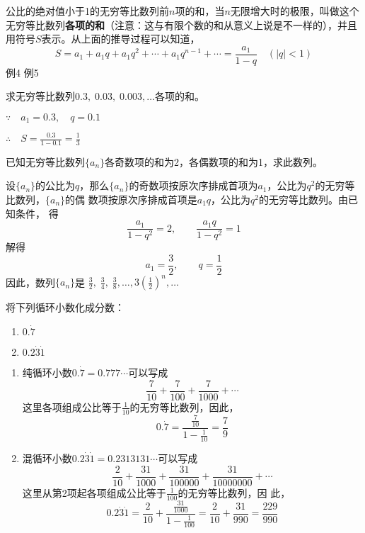 公比的绝对值小于1的无穷等比数列前$n$项的和，当$n$无限增大时的极限，叫做这个无穷等比数列\textbf{各项的和}（注意：这与有限个数的和从意义上说是不一样的），并且用符号$S$表示。从上面的推导过程可以知道，
\[S=a_1+a_1q+a_1q^2+\cdots +a_1q^{n-1}+\cdots=\frac{a_1}{1-q}\quad (|q|<1)\]
例4 
例5 



\begin{example}
    求无穷等比数列$0.3,\; 0.03,\; 0.003,\ldots$各项的和。
\end{example}

\begin{solution}
$\because\quad a_1=0.3,\quad q=0.1$

$\therefore\quad S=\frac{0.3}{1-0.1}=\frac{1}{3}$        
\end{solution}

\begin{example}
    已知无穷等比数列$\{a_n\}$各奇数项的和为2，各偶数项的和为1，求此数列。
\end{example}

\begin{solution}
设$\{a_n\}$的公比为$q$，那么$\{a_n\}$的奇数项按原次序排成首项为$a_1$，公比为$q^2$的无穷等比数列，$\{a_n\}$的偶 数项按原次序排成首项是$a_1q$，公比为$q^2$的无穷等比数列。由已知条件，
得
\[\frac{a_1}{1-q^2}=2,\qquad \frac{a_1 q}{1-q^2}=1\]
解得    
\[a_1=\frac{3}{2},\qquad q=\frac{1}{2}\]
因此，数列$\{a_n\}$是
$\frac{3}{2},\; \frac{3}{4},\; \frac{3}{8},\ldots, 3\left(\frac{1}{2}\right)^n,\ldots$
\end{solution}



\begin{example}
    将下列循环小数化成分数：
\begin{multicols}{2}
\begin{enumerate}[(1)]
    \item $0.\dot{7}$
    \item $0.2\dot{3}\dot{1}$
\end{enumerate}
\end{multicols}
\end{example}

\begin{solution}
\begin{enumerate}[(1)]
\item 纯循环小数$0.\dot{7}=0.777\cdots$可以写成
\[\frac{7}{10}+\frac{7}{100}+\frac{7}{1000}+\cdots\]
这里各项组成公比等于$\frac{1}{10}$的无穷等比数列，因此，
\[0.\dot{7}=\frac{\frac{7}{10}}{1-\frac{1}{10}}=\frac{7}{9}\]
\item 混循环小数$0.2\dot{3}\dot{1}=0.2313131\cdots$可以写成
\[\frac{2}{10}+\frac{31}{1000}+\frac{31}{100000}+\frac{31}{10000000}+\cdots\]
这里从第2项起各项组成公比等于$\frac{1}{100}$的无穷等比数列，因
此，
\[0.2\dot{3}\dot{1}=\frac{2}{10}+\frac{\frac{31}{1000}}{1-\frac{1}{100}}=\frac{2}{10}+\frac{31}{990}=\frac{229}{990}\]
\end{enumerate}
\end{solution}

